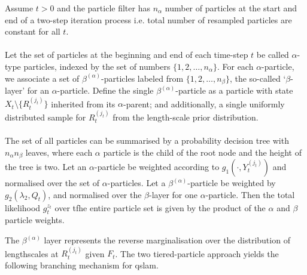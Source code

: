 \begin{defn}
Assume $t > 0$ and the particle filter has $n_\alpha$ number of particles at the start and end of a two-step iteration process i.e. total number of resampled particles are constant for all $t$.\\
\\
Let the set of particles at the beginning and end of each time-step $t$ be called $\alpha$-type particles, indexed by the set of numbers $\{1, 2, \hdots, n_\alpha\}$. For each $\alpha$-particle, we associate a set of $\beta^{(\alpha)}$-particles labeled from $\{1, 2, \hdots, n_\beta \}$, the so-called `$\beta$-layer' for an $\alpha$-particle. Define the single $\beta^{(\alpha)}$-particle as a particle with state $X_t \setminus \{R_t^{(j_t)}\} $ inherited from its $\alpha$-parent; and additionally, a single uniformly distributed sample for $R_t^{(j_t)}$ from the length-scale prior distribution. \\
\\
The set of all particles can be summarised by a probability decision tree with $n_\alpha n_\beta$ leaves, where each $\alpha$ particle is the child of the root node and the height of the tree is two. Let an $\alpha$-particle be weighted according to $ g_1(\cdot, Y_t^{(j_t)})$ and normalised over the set of $\alpha$-particles. Let a $\beta^{(\alpha)}$-particle be weighted by $g_2(\lambda_2, Q_t)$, and normalised over the $\beta$-layer for one  $\alpha$-particle. Then the total likelihood $g_t^{z_t}$ over tfhe entire particle set is given by the product of the $\alpha$ and $\beta$ particle weights. %
\end{defn}
The $\beta^{(\alpha)}$ layer represents the reverse marginalisation over the distribution of lengthscales at $R_t^{(j_t)}$ given $F_t$.  The two tiered-particle approach yields the following branching mechanism for qslam.
